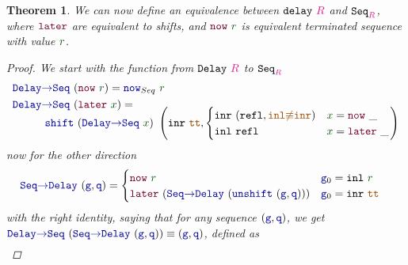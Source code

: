 \documentclass[twoside,11pt,openright]{report}
\theoremstyle{plain} %
\newtheorem{thm}{Theorem}[section]
\theoremstyle{definition}
\theoremstyle{remark}
\newcommand*{\term}[1]{\textcolor{green!30!black}{#1}} %
\newcommand*{\type}[1]{\textcolor{magenta!90!black}{#1}}
\newcommand*{\constant}[1]{\textcolor{orange!60!black}{\ensuremath{\mathtt{#1}}}}
\newcommand*{\function}[1]{\textcolor{blue!60!black}{\ensuremath{\mathtt{#1}}}}
\newcommand*{\constructor}[1]{\textcolor{purple!60!black}{\ensuremath{\mathtt{#1}}}}
\newcommand*{\typeformer}[1]{\ensuremath{\mathtt{#1}}}
\begin{document}
\begin{thm}
  \noindent We can now define an equivalence between \(\typeformer{delay}~\type{R}\) and \(\typeformer{Seq}_{\type{R}}\), where \(\constructor{later}\) are equivalent to shifts, and \(\constructor{now}~\term{r}\) is equivalent terminated sequence with value \(\term{r}\).
  \begin{proof}
    We start with the function from \(\typeformer{Delay}~\type{R}\) to \(\typeformer{Seq}_{\type{R}}\)
    \begin{equation}
      \begin{aligned}
        \function{Delay{\rightarrow}Seq}&~(\constructor{now}~\term{r}) = \function{now}_{Seq}~\term{r} \\
        \function{Delay{\rightarrow}Seq}&~(\constructor{later}~\term{x}) = \\[-3mm]
        & \strut\hspace{-8mm}\function{shift}~(\function{Delay{\rightarrow}Seq}~\term{x})~\left(\mathtt{inr}~\constant{tt} , \begin{cases} \mathtt{inr}~(\mathtt{refl} , \constant{inl{\not\equiv}inr}) & \term{x} = \constructor{now}~\_ \\ \mathtt{inl}~\mathtt{refl} & \term{x} = \constructor{later}~\_ \end{cases}\right)
      \end{aligned}
    \end{equation}
    now for the other direction
    \begin{equation}
      \begin{aligned}
        \function{Seq{\rightarrow}Delay}&~(\function{g} , \function{q}) = \begin{cases} \constructor{now}~\term{r} & \function{g}_0 = \mathtt{inl}~\term{r} \\ \constructor{later}~(\function{Seq{\rightarrow}Delay}~(\function{unshift}~(\function{g} , \function{q}))) & \function{g}_0 = \mathtt{inr}~\constant{tt} \end{cases}
      \end{aligned}
    \end{equation}
    with the right identity, saying that for any sequence \((\function{g},\function{q})\), we get \(\function{Delay{\rightarrow}Seq}~(\function{Seq{\rightarrow}Delay}~(\function{g},\function{q})) \equiv (\function{g},\function{q})\), defined as
    \begin{equation}
      \begin{aligned}

\end{aligned}
\end{equation}
\end{proof}
\end{thm}
\end{document}
